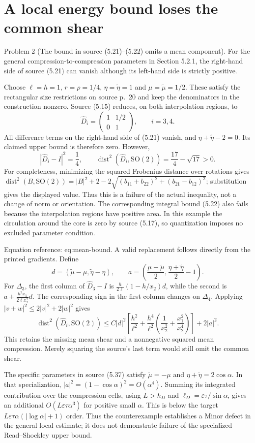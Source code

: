 \documentclass[10pt]{article}
\begin{document}
\section*{A local energy bound loses the common shear}
Problem 2 (The bound in source (5.21)–(5.22) omits a mean component).  For the general compression-to-compression parameters in Section 5.2.1, the right-hand side of source (5.21) can vanish although its left-hand side is strictly positive.\par
Choose \(\ell=h=1\), \(r=\rho=1/4\), \(\eta=\widetilde\eta=1\) and \(\mu=\widetilde\mu=1/2\). These satisfy the rectangular size restrictions on source p. 20 and keep the denominators in the construction nonzero. Source (5.15) reduces, on both interpolation regions, to \[\widehat D_i=
 \begin{pmatrix}1&1/2\\0&1\end{pmatrix},\qquad i=3,4.\] All difference terms on the right-hand side of (5.21) vanish, and \(\eta+\widetilde\eta-2=0\). Its claimed upper bound is therefore zero. However, \[|\widehat D_i-I|^2=\frac14,\qquad
 \operatorname{dist}^2(\widehat D_i,\mathrm{SO}(2))=\frac{17}{4}-\sqrt{17}>0.\] For completeness, minimizing the squared Frobenius distance over rotations gives \(\operatorname{dist}^2(B,\mathrm{SO}(2))=|B|^2+2-2\sqrt{(b_{11}+b_{22})^2+(b_{21}-b_{12})^2}\); substitution gives the displayed value. Thus this is a failure of the actual inequality, not a change of norm or orientation. The corresponding integral bound (5.22) also fails because the interpolation regions have positive area. In this example the circulation around the core is zero by source (5.17), so quantization imposes no excluded parameter condition.\par
Equation reference: eq:mean-bound. A valid replacement follows directly from the printed gradients. Define \[d=(\widetilde\mu-\mu,\widetilde\eta-\eta),\qquad
 a=\left(\frac{\mu+\widetilde\mu}{2},
          \frac{\eta+\widetilde\eta}{2}-1\right).\] For \(\Delta_3\), the first column of \(\widehat D_3-I\) is \(\frac{h}{2\ell}(1-h/x_2)d\), while the second is \(a+\frac{h^2x_1}{2\ell x_2^2}d\). The corresponding sign in the first column changes on \(\Delta_4\). Applying \(|v+w|^2\le2|v|^2+2|w|^2\) gives \[
 \operatorname{dist}^2(\widehat D_i,\mathrm{SO}(2))
 \le C|d|^2\left[
       \frac{h^2}{\ell^2}
       +\frac{h^4}{\ell^2}
         \left(\frac1{x_2^2}+\frac{x_1^2}{x_2^4}\right)\right]
       +2|a|^2.\] This retains the missing mean shear and a nonnegative squared mean compression. Merely squaring the source’s last term would still omit the common shear.\par
The specific parameters in source (5.37) satisfy \(\widetilde\mu=-\mu\) and \(\eta+\widetilde\eta=2\cos\alpha\). In that specialization, \(|a|^2=(1-\cos\alpha)^2=O(\alpha^4)\). Summing its integrated contribution over the compression cells, using \(L>h_D\) and \(\ell_D=\varepsilon\tau/\sin\alpha\), gives an additional \(O(L\varepsilon\tau\alpha^3)\) for positive small \(\alpha\). This is below the target \(L\varepsilon\tau\alpha(|\log\alpha|+1)\) order. Thus the counterexample establishes a Minor defect in the general local estimate; it does not demonstrate failure of the specialized Read–Shockley upper bound.\par
\end{document}
